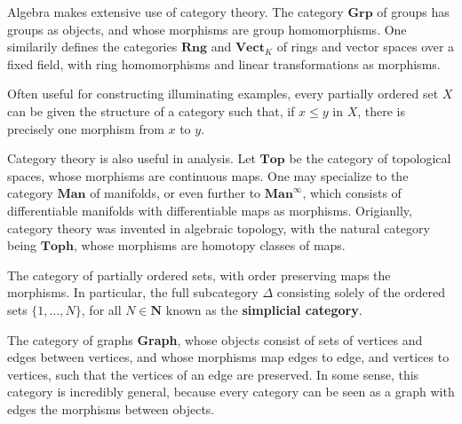\begin{example}
    Algebra makes extensive use of category theory. The category $\mathbf{Grp}$ of groups has groups as objects, and whose morphisms are group homomorphisms. One similarily defines the categories $\mathbf{Rng}$ and $\mathbf{Vect}_K$ of rings and vector spaces over a fixed field, with ring homomorphisms and linear transformations as morphisms.
\end{example}

\begin{example}
    Often useful for constructing illuminating examples, every partially ordered set $X$ can be given the structure of a category such that, if $x \leq y$ in $X$, there is precisely one morphism from $x$ to $y$.
\end{example}

\begin{example}
    Category theory is also useful in analysis. Let $\mathbf{Top}$ be the category of topological spaces, whose morphisms are continuous maps. One may specialize to the category $\mathbf{Man}$ of manifolds, or even further to $\mathbf{Man}^\infty$, which consists of differentiable manifolds with differentiable maps as morphisms. Origianlly, category theory was invented in algebraic topology, with the natural category being $\mathbf{Toph}$, whose morphisms are homotopy classes of maps.
\end{example}

\begin{example}
    The category of partially ordered sets, with order preserving maps the morphisms. In particular, the full subcategory $\Delta$ consisting solely of the ordered sets $\{ 1, \dots, N \}$, for all $N \in \mathbf{N}$ known as the {\bf simplicial category}.
\end{example}

\begin{example}
    The category of graphs {\bf Graph}, whose objects consist of sets of vertices and edges between vertices, and whose morphisms map edges to edge, and vertices to vertices, such that the vertices of an edge are preserved. In some sense, this category is incredibly general, because every category can be seen as a graph with edges the morphisms between objects.
\end{example}

